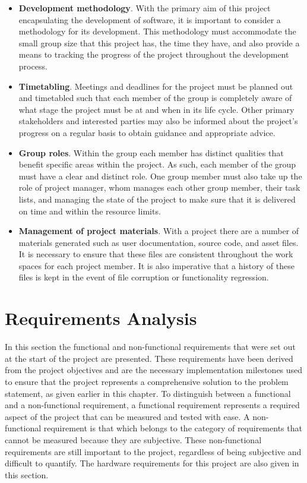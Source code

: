         \begin{itemize}
            \item \textbf{Development methodology}. With the primary aim of this project encapsulating the development of software, it is important to consider a methodology for its development. This methodology must accommodate the small group size that this project has, the time they have, and also provide a means to tracking the progress of the project throughout the development process.
            \item \textbf{Timetabling}. Meetings and deadlines for the project must be planned out and timetabled such that each member of the group is completely aware of what stage the project must be at and when in its life cycle. Other primary stakeholders and interested parties may also be informed about the project's progress on a regular basis to obtain guidance and appropriate advice.
            \item \textbf{Group roles}. Within the group each member has distinct qualities that benefit specific areas within the project. As such, each member of the group must have a clear and distinct role. One group member must also take up the role of project manager, whom manages each other group member, their task lists, and managing the state of the project to make sure that it is delivered on time and within the resource limits.
            \item \textbf{Management of project materials}. With a project there are a number of materials generated such as user documentation, source code, and asset files. It is necessary to ensure that these files are consistent throughout the work spaces for each project member. It is also imperative that a history of these files is kept in the event of file corruption or functionality regression.
        \end{itemize}
    
\section{Requirements Analysis}
\label{sec:requirements}

    In this section the functional and non-functional requirements that were set out at the start of the project are presented. These requirements have been derived from the project objectives and are the necessary implementation milestones used to ensure that the project represents a comprehensive solution to the problem statement, as given earlier in this chapter. To distinguish between a functional and a non-functional requirement, a functional requirement represents a required aspect of the project that can be measured and tested with ease. A non-functional requirement is that which belongs to the category of requirements that cannot be measured because they are subjective. These non-functional requirements are still important to the project, regardless of being subjective and difficult to quantify. The hardware requirements for this project are also given in this section.
    
